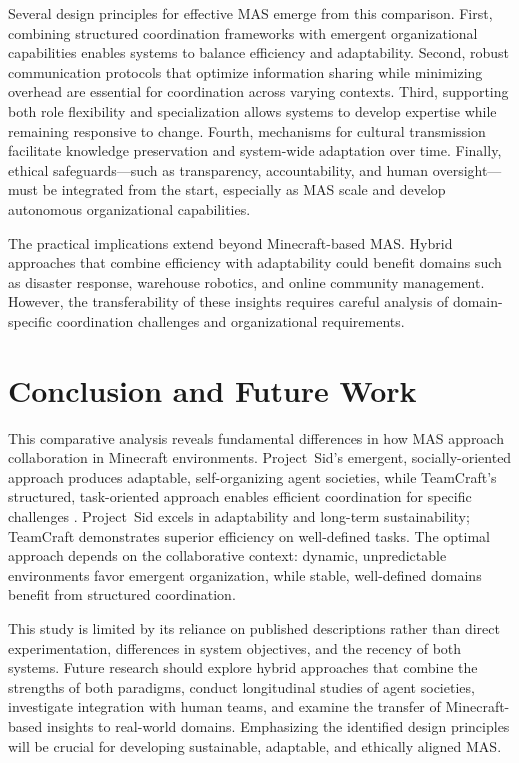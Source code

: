 \documentclass[a4paper, 12pt]{article}
\begin{document}
Several design principles for effective MAS emerge from this comparison. First, combining structured coordination frameworks with emergent organizational capabilities enables systems to balance efficiency and adaptability. Second, robust communication protocols that optimize information sharing while minimizing overhead are essential for coordination across varying contexts. Third, supporting both role flexibility and specialization allows systems to develop expertise while remaining responsive to change. Fourth, mechanisms for cultural transmission facilitate knowledge preservation and system-wide adaptation over time. Finally, ethical safeguards---such as transparency, accountability, and human oversight---must be integrated from the start, especially as MAS scale and develop autonomous organizational capabilities.

The practical implications extend beyond Minecraft-based MAS. Hybrid approaches that combine efficiency with adaptability could benefit domains such as disaster response, warehouse robotics, and online community management. However, the transferability of these insights requires careful analysis of domain-specific coordination challenges and organizational requirements.

\section{Conclusion and Future Work}

This comparative analysis reveals fundamental differences in how MAS approach collaboration in Minecraft environments. Project~Sid's emergent, socially-oriented approach produces adaptable, self-organizing agent societies, while TeamCraft's structured, task-oriented approach enables efficient coordination for specific challenges \autocite{Altera2024, Long2024}. Project~Sid excels in adaptability and long-term sustainability; TeamCraft demonstrates superior efficiency on well-defined tasks. The optimal approach depends on the collaborative context: dynamic, unpredictable environments favor emergent organization, while stable, well-defined domains benefit from structured coordination.

This study is limited by its reliance on published descriptions rather than direct experimentation, differences in system objectives, and the recency of both systems. Future research should explore hybrid approaches that combine the strengths of both paradigms, conduct longitudinal studies of agent societies, investigate integration with human teams, and examine the transfer of Minecraft-based insights to real-world domains. Emphasizing the identified design principles will be crucial for developing sustainable, adaptable, and ethically aligned MAS.
\end{document}
